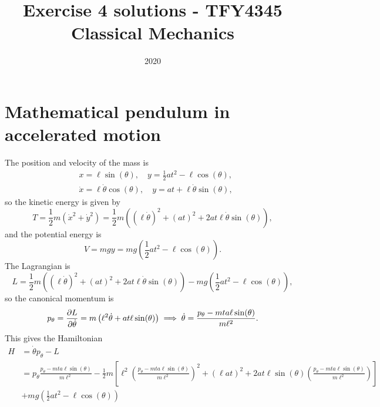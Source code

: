 \documentclass{article}
\title{Exercise 4 solutions - TFY4345 Classical Mechanics}
\date{2020}
\begin{document}
    \maketitle
    \section{Mathematical pendulum in accelerated motion}
        The position and velocity of the mass is
        \begin{align*}
            & x = \ell \sin(\theta), \quad y = \frac{1}{2} a t^2  - \ell \cos(\theta), \\
            & \dot x = \ell \dot \theta \cos(\theta), \quad y = a t + \ell \dot \theta \sin(\theta),
        \end{align*}
        so the kinetic energy is given by
        \begin{equation*}
            T = \frac{1}{2}m \left(\dot x^2 + \dot y^2\right) = \frac{1}{2}m \left( (\ell \dot \theta)^2  + (a t)^2 + 2 a t \ell \dot \theta \sin(\theta)\right),
        \end{equation*}
        and the potential energy is 
        \begin{equation*}
            V = mgy = mg \left(\frac{1}{2}a t^2 - \ell \cos(\theta)\right).
        \end{equation*}
        The Lagrangian is
        \begin{equation*}
            L = \frac{1}{2}m \left( (\ell \dot \theta)^2  + (a t)^2 + 2 a t \ell \dot \theta \sin(\theta)\right) - mg \left(\frac{1}{2}a t^2 - \ell \cos(\theta)\right),
        \end{equation*}
        so the canonical momentum is
        \begin{equation*}
            p_\theta = \pdv{L}{\dot \theta} = m\left( \ell^2 \dot \theta + a t \ell\sin(\theta)\right) \implies 
            \dot \theta  = \frac{p_\theta - m t a \ell\sin(\theta)}{m \ell^2}.
        \end{equation*} 
        This gives the Hamiltonian
        \begin{align*}
            H &= \dot \theta p_\theta - L \\
            & = p_\theta \frac{p_\theta - m t a \ell \sin(\theta)}{m \ell^2} - 
            \frac{1}{2}m \left[ \ell^2 \left(\frac{p_\theta - m t a \ell\sin(\theta)}{m \ell^2}\right)^2  + (\ell at)^2 + 2 a t \ell \sin(\theta) \left(\frac{p_\theta - m t a \ell \sin(\theta)}{m \ell^2}\right) \right] \\
            & +  mg \left(\frac{1}{2}a t^2 - \ell \cos(\theta)\right) \\
        \end{align*}
\end{document}
